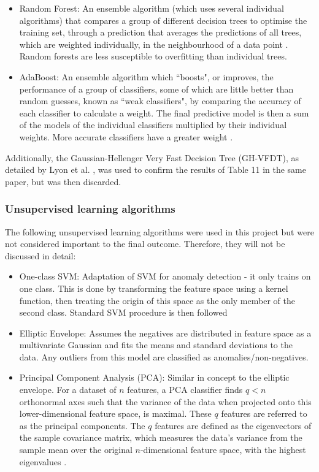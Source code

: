 \documentclass[12pt]{article}
\begin{document}
\begin{itemize}
\item Random Forest: An ensemble algorithm (which uses several individual algorithms) that compares a group of different decision trees to optimise the training set, through a prediction that averages the predictions of all trees, which are weighted individually, in the neighbourhood of a data point \cite{friedman2001elements}. Random forests are less susceptible to overfitting than individual trees.

\item AdaBoost: An ensemble algorithm which ``boosts", or improves, the performance of a group of classifiers, some of which are little better than random guesses, known as ``weak classifiers", by comparing the accuracy of each classifier to calculate a weight. The final predictive model is then a sum of the models of the individual classifiers multiplied by their individual weights. More accurate classifiers have a greater weight \cite{friedman2001elements}.
\end{itemize}

Additionally, the Gaussian-Hellenger Very Fast Decision Tree (GH-VFDT), as detailed by Lyon et al. \cite{lyon2016fifty}, was used to confirm the results of Table 11 in the same paper, but was then discarded.

\subsubsection{Unsupervised learning algorithms}
The following unsupervised learning algorithms were used in this project but were not considered important to the final outcome. Therefore, they will not be discussed in detail:
\begin{itemize}
\item One-class SVM: Adaptation of SVM for anomaly detection - it only trains on one class. This is done by transforming the feature space using a kernel function, then treating the origin of this space as the only member of the second class. Standard SVM procedure is then followed \cite{manevitz2001one}
\item Elliptic Envelope: Assumes the negatives are distributed  in feature space as a multivariate Gaussian and fits the means and standard deviations to the data. Any outliers from this model are classified as anomalies/non-negatives.
\item Principal Component Analysis (PCA): Similar in concept to the elliptic envelope. For a dataset of $n$ features, a PCA classifier finds $q < n$ orthonormal axes such that the variance of the data when projected onto this lower-dimensional feature space, is maximal. These $q$ features are referred to as the principal components. The $q$ features are defined as the eigenvectors of the sample covariance matrix, which measures the data's variance from the sample mean over the original $n$-dimensional feature space,  with the highest eigenvalues \cite{tipping1999mixtures}.
\end{itemize}
\end{document}
